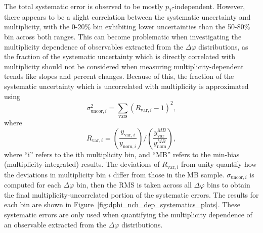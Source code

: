 The total systematic error is observed to be mostly $p_{T}$-independent. However, there appears to be a slight correlation between the systematic uncertainty and multiplicity, with the 0-20\% bin exhibiting lower uncertainties than the 50-80\% bin across both \pt ranges. This can become problematic when investigating the multiplicity dependence of observables extracted from the $\Delta\varphi$ distributions, as the fraction of the systematic uncertainty which is directly correlated with multiplicity should not be considered when measuring multiplicity-dependent trends like slopes and percent changes. Because of this, the fraction of the systematic uncertainty which is uncorrelated with multiplicity is approximated using
%
\begin{equation}
    \label{eq:uncorrelated_fraction_1}
    \sigma_{\text{uncor}, i}^2 = \sum_{\text{vars}}(R_{\text{var}, i} - 1)^2,
\end{equation}
where 
\begin{equation}
    \label{eq:uncorrelated_fraction_2}
    R_{\text{var}, i} = (\frac{y_{\text{var}, i}}{y_{\text{nom}, i}})/ (\frac{y_{\text{var}}^{MB}}{y_{\text{nom}}^{MB}}),
\end{equation}
%
where ``i'' refers to the ith multiplicity bin, and ``MB'' refers to the min-bias (multiplicity-integrated) results. The deviations of $R_{\text{var}, i}$ from unity quantify how the deviations in multiplicity bin $i$ differ from those in the MB sample. $\sigma_{\text{uncor}, i}$ is computed for each $\Delta\varphi$ bin, then the RMS is taken across all $\Delta\varphi$ bins to obtain the final multiplicity-uncorrelated portion of the systematic errors. The results for each \pt bin are shown in Figure~\ref{fig:dphi_nch_dep_systematics_plots}. These systematic errors are only used when quantifying the multiplicity dependence of an observable extracted from the $\Delta\varphi$ distributions.

